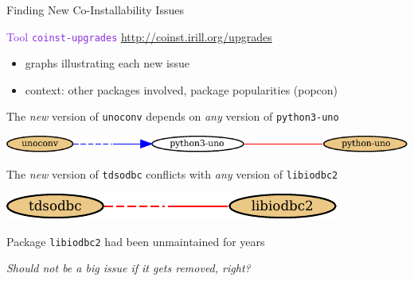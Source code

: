 \documentclass[xcolor={dvipsnames}]{beamer}
\newcommand{\EEE}[1]{\textcolor{BlueViolet}{#1}}
\begin{document}
\begin{frame}{Finding New Co-Installability Issues}

\EEE{Tool \texttt{coinst-upgrades}}
\hspace{1cm}
\url{http://coinst.irill.org/upgrades}
\begin{itemize}
\item graphs illustrating each new issue
\item context: other packages involved, package popularities (popcon)
\end{itemize}

\vspace{2em}



The \emph{new} version of \texttt{unoconv} depends on \emph{any}
version of \texttt{python3-uno}
\begin{center}
\includegraphics[scale=0.8]{python-uno}
\end{center}

The \emph{new} version of \texttt{tdsodbc} conflicts with \emph{any}
version of \texttt{libiodbc2}
\begin{center}
\includegraphics[scale=0.8]{libiodbc2}
\end{center}

\pause

Package \texttt{libiodbc2} had been unmaintained for years

\emph{Should not be a big issue if it gets removed, right?}

\end{frame}
\end{document}
